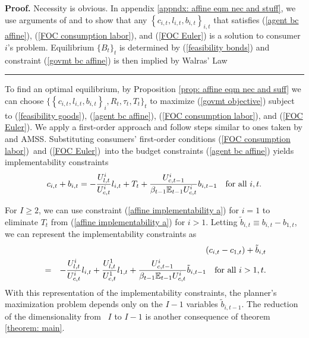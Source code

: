 \documentclass[thmsb,11pt]{article}
\newenvironment{proof}[1][Proof]{\noindent \textbf{#1.} }{\  \rule{0.5em}{0.5em}}
\begin{document}
\begin{proof}
Necessity is obvious. In  appendix   \ref{appndx: affine eqm nec and stuff}, we use arguments of \cite{Magill1994} and \cite{Constantinides1996} to show that any $\left \{
c_{i,t},l_{i,t},b_{i,t}\right \} _{i,t}$ that satisfies (\ref{agent bc
affine}), (\ref{FOC consumption labor}), and (\ref{FOC Euler}) is a solution
to consumer $i$'s  problem. Equilibrium $\{B_{t}\}_t$ is determined by
(\ref{feasibility bonds}) and constraint (\ref{govmt bc affine}) is then
implied by Walras' Law
\end{proof}

To find an optimal equilibrium, by Proposition  \ref{prop: affine eqm nec and suff}
we can choose $\{ \left \{ c_{i,t},l_{i,t},b_{i,t}\right \} _{i},R_{t},\tau
_{t},T_{t}\}_{t}$ to maximize (\ref{govmt objective}) subject to (\ref{feasibility goods}), (\ref{agent bc affine}), (\ref{FOC consumption labor}), and (\ref{FOC Euler}).
We  apply a first-order approach and follow steps similar to ones taken by \cite{LucasJr.1983} and AMSS.
 Substituting consumers' first-order
conditions (\ref{FOC consumption labor})\ and (\ref{FOC Euler})\ into the
budget constraints (\ref{agent bc affine}) yields implementability
constraints%
\begin{equation}
c_{i,t}+b_{i,t}=-\frac{U_{l,t}^{i}}{U_{c,t}^{i}}l_{i,t}+T_{t}+\frac{%
U_{c,t-1}^{i}}{\beta_{t-1} \mathbb{E}_{t-1}U_{c,t}^{i}}b_{i,t-1}\ \text{for\ all\ }%
i,t.  \label{affine implementability a}
\end{equation}

\noindent For $I\geq 2$, we can use constraint (\ref{affine implementability
a}) for  $i=1$ to eliminate $T_{t}$ from (\ref{affine implementability a}) for $i > 1$. Letting $\tilde{b}%
_{i,t}\equiv b_{i,t}-b_{1,t}$, we can represent the implementability constraints
as
\begin{eqnarray}
&&\left( c_{i,t}-c_{1,t}\right) +\tilde{b}_{i,t}
\label{affine implementability b} \\
&=&-\frac{U_{l,t}^{i}}{U_{c,t}^{i}}l_{i,t}+\frac{U^1_{l,t}}{U^1_{c,t}}l_{1,t} +\frac{U_{c,t-1}^{i}}{\beta_{t-1} \mathbb{E}%
_{t-1}U_{c,t}^{i}}\tilde{b}_{i,t-1}\ \text{for\ all\ }i>1,t.  \notag
\end{eqnarray}
\noindent With this representation of the implementability constraints, the planner's
maximization problem depends only on the $I-1$ variables $\tilde{b}_{i,t-1}.$
The reduction of  the dimensionality from \ $I$ to $I-1$ is
 another consequence of theorem \ref{theorem: main}.
\end{document}
